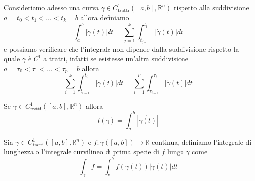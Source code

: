 Consideriamo adesso una curva $\gamma \in C^1_{\text{tratti}}([a, b], \mathbb{R}^n)$ rispetto alla suddivisione $a=t_0 < t_1 < \ldots < t_k = b$ allora definiamo
$$
\int_a^b |\dot{\gamma}(t)|dt = \sum_{j=1}^k \int_{t_{j-1}}^{t_j} |\dot{\gamma}(t)|dt 
$$
e possiamo verificare che l'integrale non dipende dalla suddivisione rispetto la quale $\gamma$ è $C^1$ a tratti, infatti se esistesse un'altra suddivisione $a=\tau_0 < \tau_1 < \ldots < \tau_p = b$ allora
$$
\sum_{i=1}^k \int_{t_{i-1}}^{t_{i}} |\dot{\gamma}(t)|dt = \sum_{i=1}^p \int_{\tau_{i-1}}^{\tau_{i}} |\dot{\gamma}(t)|dt
$$
\begin{theorem}
Se $\gamma \in C^1_{\text{tratti}}([a, b], \mathbb{R}^n)$ allora
$$
\mathit{l}(\gamma) = \int_a^b |\dot{\gamma(t)}|
$$
\end{theorem}
\begin{definition}
	Sia $\gamma \in C^1_{\text{tratti}}([a,b], \mathbb{R}^n)$ e $f: \gamma([a,b]) \to \mathbb{R}$ continua, definiamo l'integrale di lunghezza o l'integrale curvilineo di prima specie di $f$ lungo $\gamma$ come
	$$
		\int_{\gamma} f = \int_a^b f(\gamma(t))|\dot{\gamma}(t)|dt
	$$
\end{definition}





